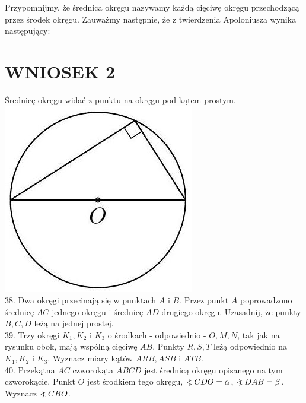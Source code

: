 \documentclass[10pt]{article}
\newcommand\Varangle{\mathop{{<\!\!\!\!\!\text{\small)}}\:}\nolimits}
\begin{document}
Przypomnijmy, że średnica okręgu nazywamy każdą cięciwę okręgu przechodzącą przez środek okręgu. Zauważmy następnie, że z twierdzenia Apoloniusza wynika następujący:

\section*{WNIOSEK 2}
Średnicę okręgu widać z punktu na okręgu pod kątem prostym.\\
\includegraphics[max width=\textwidth, center]{2024_11_21_71f62bd117d375398909g-189}\\
38. Dwa okręgi przecinają się w punktach \(A\) i \(B\). Przez punkt \(A\) poprowadzono średnicę \(A C\) jednego okręgu i średnicę \(A D\) drugiego okręgu. Uzasadnij, że punkty \(B, C, D\) leżą na jednej prostej.\\
39. Trzy okręgi \(K_{1}, K_{2}\) i \(K_{3}\) o środkach - odpowiednio - \(O, M, N\), tak jak na rysunku obok, mają wspólną cięciwę \(A B\). Punkty \(R, S, T\) leżą odpowiednio na \(K_{1}, K_{2}\) i \(K_{3}\). Wyznacz miary kątów \(A R B, A S B\) i \(A T B\).\\
40. Przekątna \(A C\) czworokąta \(A B C D\) jest średnicą okręgu opisanego na tym czworokącie. Punkt \(O\) jest środkiem tego okręgu, \(\Varangle C D O=\alpha\), \(\Varangle D A B=\beta\). Wyznacz \(\Varangle C B O\).\\
\end{document}
